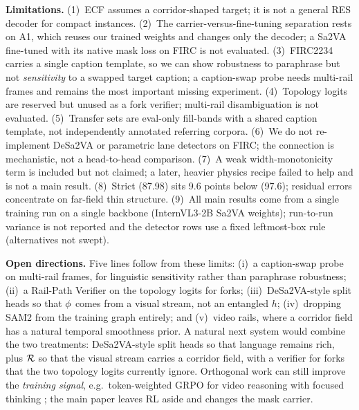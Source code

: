 \textbf{Limitations.}
(1)~ECF assumes a corridor-shaped target; it is not a general RES decoder for compact instances.
(2)~The carrier-versus-fine-tuning separation rests on A1, which reuses our trained weights and changes only the decoder; a Sa2VA fine-tuned with its native mask loss on FIRC is not evaluated.
(3)~FIRC2234 carries a single caption template, so we can show robustness to paraphrase but not \emph{sensitivity} to a swapped target caption; a caption-swap probe needs multi-rail frames and remains the most important missing experiment.
(4)~Topology logits are reserved but unused as a fork verifier; multi-rail disambiguation is not evaluated.
(5)~Transfer sets are eval-only fill-bands with a shared caption template, not independently annotated referring corpora.
(6)~We do not re-implement DeSa2VA or parametric lane detectors on FIRC; the connection is mechanistic, not a head-to-head comparison.
(7)~A weak width-monotonicity term is included but not claimed; a later, heavier physics recipe failed to help and is not a main result.
(8)~Strict  (87.98) sits 9.6 points below  (97.6); residual errors concentrate on far-field thin structure.
(9)~All main results come from a single training run on a single backbone (InternVL3-2B Sa2VA weights); run-to-run variance is not reported and the detector rows use a fixed leftmost-box rule (alternatives not swept).

\textbf{Open directions.}
Five lines follow from these limits: (i)~a caption-swap probe on multi-rail frames, for linguistic sensitivity rather than paraphrase robustness; (ii)~a Rail-Path Verifier on the topology logits for forks; (iii)~DeSa2VA-style split heads so that $\phi$ comes from a visual stream, not an entangled $h$; (iv)~dropping SAM2 from the training graph entirely; and (v)~video rails, where a corridor field has a natural temporal smoothness prior.
A natural next system would combine the two treatments: DeSa2VA-style split heads so that language remains rich, plus $\mathcal{R}$ so that the visual stream carries a corridor field, with a verifier for forks that the two topology logits currently ignore.
Orthogonal work can still improve the \emph{training signal}, e.g.\ token-weighted GRPO for video reasoning with focused thinking \citep{dang2025twgrpo}; the main paper leaves RL aside and changes the mask carrier.
